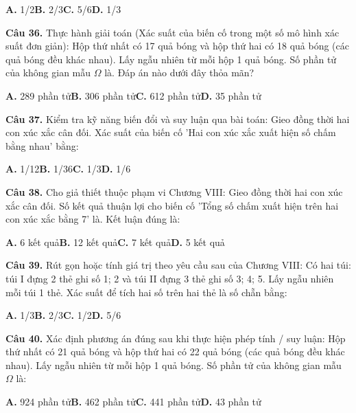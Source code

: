 \documentclass[11pt,a4paper]{article}
\begin{document}
\hspace*{1.5em}\textbf{A.} 1/2\quad\quad \textbf{B.} 2/3\quad\quad \textbf{C.} 5/6\quad\quad \textbf{D.} 1/3\par\vspace{2pt}
\textbf{\color{primary} Câu 36.} Thực hành giải toán (Xác suất của biến cố trong một số mô hình xác suất đơn giản): Hộp thứ nhất có 17 quả bóng và hộp thứ hai có 18 quả bóng (các quả bóng đều khác nhau). Lấy ngẫu nhiên từ mỗi hộp 1 quả bóng. Số phần tử của không gian mẫu $\Omega$ là. Đáp án nào dưới đây thỏa mãn?\par
\hspace*{1.5em}\textbf{A.} 289 phần tử\quad\quad \textbf{B.} 306 phần tử\quad\quad \textbf{C.} 612 phần tử\quad\quad \textbf{D.} 35 phần tử\par\vspace{2pt}
\textbf{\color{primary} Câu 37.} Kiểm tra kỹ năng biến đổi và suy luận qua bài toán: Gieo đồng thời hai con xúc xắc cân đối. Xác suất của biến cố 'Hai con xúc xắc xuất hiện số chấm bằng nhau' bằng:\par
\hspace*{1.5em}\textbf{A.} 1/12\quad\quad \textbf{B.} 1/36\quad\quad \textbf{C.} 1/3\quad\quad \textbf{D.} 1/6\par\vspace{2pt}
\textbf{\color{primary} Câu 38.} Cho giả thiết thuộc phạm vi Chương VIII: Gieo đồng thời hai con xúc xắc cân đối. Số kết quả thuận lợi cho biến cố 'Tổng số chấm xuất hiện trên hai con xúc xắc bằng 7' là. Kết luận đúng là:\par
\hspace*{1.5em}\textbf{A.} 6 kết quả\quad\quad \textbf{B.} 12 kết quả\quad\quad \textbf{C.} 7 kết quả\quad\quad \textbf{D.} 5 kết quả\par\vspace{2pt}
\textbf{\color{primary} Câu 39.} Rút gọn hoặc tính giá trị theo yêu cầu sau của Chương VIII: Có hai túi: túi I đựng 2 thẻ ghi số 1; 2 và túi II đựng 3 thẻ ghi số 3; 4; 5. Lấy ngẫu nhiên mỗi túi 1 thẻ. Xác suất để tích hai số trên hai thẻ là số chẵn bằng:\par
\hspace*{1.5em}\textbf{A.} 1/3\quad\quad \textbf{B.} 2/3\quad\quad \textbf{C.} 1/2\quad\quad \textbf{D.} 5/6\par\vspace{2pt}
\textbf{\color{primary} Câu 40.} Xác định phương án đúng sau khi thực hiện phép tính / suy luận: Hộp thứ nhất có 21 quả bóng và hộp thứ hai có 22 quả bóng (các quả bóng đều khác nhau). Lấy ngẫu nhiên từ mỗi hộp 1 quả bóng. Số phần tử của không gian mẫu $\Omega$ là:\par
\hspace*{1.5em}\textbf{A.} 924 phần tử\quad\quad \textbf{B.} 462 phần tử\quad\quad \textbf{C.} 441 phần tử\quad\quad \textbf{D.} 43 phần tử\par\vspace{2pt}
\end{document}
